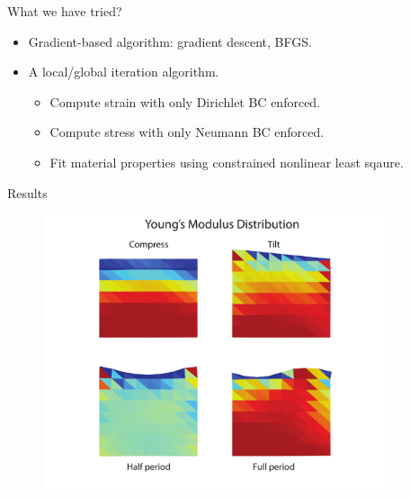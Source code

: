 \begin{frame}{What we have tried?}
\begin{itemize}
\item Gradient-based algorithm: gradient descent, BFGS.
\item A local/global iteration algorithm.
\begin{itemize}
\item Compute strain with only Dirichlet BC enforced.
\item Compute stress with only Neumann BC enforced.
\item Fit material properties using constrained nonlinear least sqaure.
\end{itemize}
\end{itemize}
\end{frame}

\begin{frame}{Results}
\begin{figure}
\includegraphics[width=0.9\textwidth]{Images/box_compression_test.pdf}
\end{figure}

\end{frame}


